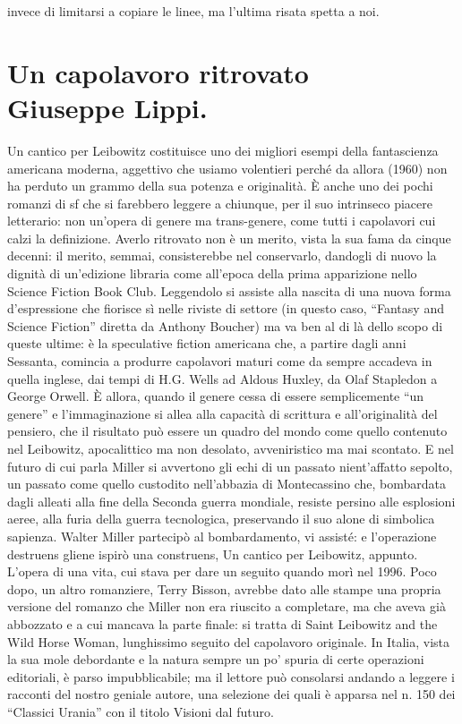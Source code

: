 invece di limitarsi a copiare le linee, ma l'ultima risata spetta a noi. 

{ \chapter*{Un capolavoro ritrovato\\{\footnotesize Giuseppe Lippi.}}}
Un cantico per Leibowitz costituisce uno dei migliori esempi della fantascienza americana moderna, aggettivo che usiamo volentieri perché da allora (1960) non ha perduto un grammo della sua potenza e originalità. È anche uno dei pochi romanzi di sf che si farebbero leggere a chiunque, per il suo intrinseco piacere letterario: non un'opera di genere ma trans-genere, come tutti i capolavori cui calzi la definizione. Averlo ritrovato non è un merito, vista la sua fama da cinque decenni: il merito, semmai, consisterebbe nel conservarlo, dandogli di nuovo la dignità di un'edizione libraria come all'epoca della prima apparizione nello Science Fiction Book Club. Leggendolo si assiste alla nascita di una nuova forma d'espressione che fiorisce sì nelle riviste di settore (in questo caso, “Fantasy and Science Fiction” diretta da Anthony Boucher) ma va ben al di là dello scopo di queste ultime: è la speculative fiction americana che, a partire dagli anni Sessanta, comincia a produrre capolavori maturi come da sempre accadeva in quella inglese, dai tempi di H.G. Wells ad Aldous Huxley, da Olaf Stapledon a George Orwell. È allora, quando il genere cessa di essere semplicemente “un genere” e l'immaginazione si allea alla capacità di scrittura e all'originalità del pensiero, che il risultato può essere un quadro del mondo come quello contenuto nel Leibowitz, apocalittico ma non desolato, avveniristico ma mai scontato. E nel futuro di cui parla Miller si avvertono gli echi di un passato nient'affatto sepolto, un passato come quello custodito nell'abbazia di Montecassino che, bombardata dagli alleati alla fine della Seconda guerra mondiale, resiste persino alle esplosioni aeree, alla furia della guerra tecnologica, preservando il suo alone di simbolica sapienza. Walter Miller partecipò al bombardamento, vi assisté: e l'operazione destruens gliene ispirò una construens, Un cantico per Leibowitz, appunto. L'opera di una vita, cui stava per dare un seguito quando morì nel 1996. Poco dopo, un altro romanziere, Terry Bisson, avrebbe dato alle stampe una propria versione del romanzo che Miller non era riuscito a completare, ma che aveva già abbozzato e a cui mancava la parte finale: si tratta di Saint Leibowitz and the Wild Horse Woman, lunghissimo seguito del capolavoro originale. In Italia, vista la sua mole debordante e la natura sempre un po' spuria di certe operazioni editoriali, è parso impubblicabile; ma il lettore può consolarsi andando a leggere i racconti del nostro geniale autore, una selezione dei quali è apparsa nel n. 150 dei “Classici Urania” con il titolo Visioni dal futuro.


